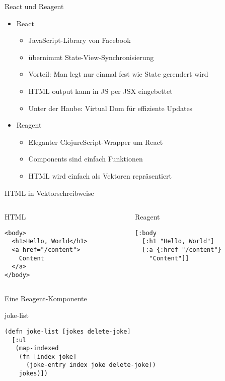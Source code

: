 \documentclass[presentation]{beamer}
\begin{document}
\begin{frame}{React und Reagent}
  \begin{itemize}
  \item React
    \begin{itemize}
    \item JavaScript-Library von Facebook
    \item übernimmt State-View-Synchronisierung
    \item Vorteil: Man legt nur einmal fest wie State gerendert wird
    \item HTML output kann in JS per JSX eingebettet
    \item Unter der Haube: Virtual Dom für effiziente Updates
    \end{itemize}
  \item Reagent
    \begin{itemize}
    \item Eleganter ClojureScript-Wrapper um React
    \item Components sind einfach Funktionen
    \item HTML wird einfach als Vektoren repräsentiert
    \end{itemize}
  \end{itemize}
\end{frame}

\begin{frame}[fragile]{HTML in Vektorschreibweise}
  \begin{columns}
    \begin{column}{0.5\textwidth}
      \begin{block}{HTML}
\begin{verbatim}
<body>
  <h1>Hello, World</h1>
  <a href="/content">
    Content
  </a>
</body>
\end{verbatim}
      \end{block}
    \end{column}
    \begin{column}{0.5\textwidth}
      \begin{block}{Reagent}
\begin{verbatim}
[:body
  [:h1 "Hello, World"]
  [:a {:href "/content"}
    "Content"]]


\end{verbatim}
      \end{block}
    \end{column}
  \end{columns}
\end{frame}

\begin{frame}[fragile]{Eine Reagent-Komponente}
  \begin{block}{joke-list}
\begin{verbatim}
(defn joke-list [jokes delete-joke]
  [:ul
   (map-indexed
    (fn [index joke]
      (joke-entry index joke delete-joke))
    jokes)])
\end{verbatim}
  \end{block}
\end{frame}
\end{document}
